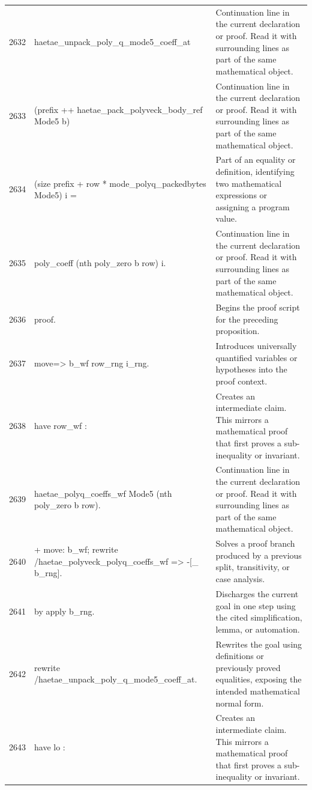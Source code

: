 \documentclass[10pt]{article}
\begin{document}
\begin{longtable}{r L{0.53\textwidth} L{0.37\textwidth}}
2632 & {\ttfamily\scriptsize   haetae\_unpack\_poly\_q\_mode5\_coeff\_at} & Continuation line in the current declaration or proof.  Read it with surrounding lines as part of the same mathematical object. \\
2633 & {\ttfamily\scriptsize     (prefix ++ haetae\_pack\_polyveck\_body\_ref Mode5 b)} & Continuation line in the current declaration or proof.  Read it with surrounding lines as part of the same mathematical object. \\
2634 & {\ttfamily\scriptsize     (size prefix + row * mode\_polyq\_packedbytes Mode5) i =} & Part of an equality or definition, identifying two mathematical expressions or assigning a program value. \\
2635 & {\ttfamily\scriptsize   poly\_coeff (nth poly\_zero b row) i.} & Continuation line in the current declaration or proof.  Read it with surrounding lines as part of the same mathematical object. \\
2636 & {\ttfamily\scriptsize proof.} & Begins the proof script for the preceding proposition. \\
2637 & {\ttfamily\scriptsize move=> b\_wf row\_rng i\_rng.} & Introduces universally quantified variables or hypotheses into the proof context. \\
2638 & {\ttfamily\scriptsize have row\_wf :} & Creates an intermediate claim.  This mirrors a mathematical proof that first proves a sub-inequality or invariant. \\
2639 & {\ttfamily\scriptsize   haetae\_polyq\_coeffs\_wf Mode5 (nth poly\_zero b row).} & Continuation line in the current declaration or proof.  Read it with surrounding lines as part of the same mathematical object. \\
2640 & {\ttfamily\scriptsize + move: b\_wf; rewrite /haetae\_polyveck\_polyq\_coeffs\_wf => -[\_ b\_rng].} & Solves a proof branch produced by a previous split, transitivity, or case analysis. \\
2641 & {\ttfamily\scriptsize   by apply b\_rng.} & Discharges the current goal in one step using the cited simplification, lemma, or automation. \\
2642 & {\ttfamily\scriptsize rewrite /haetae\_unpack\_poly\_q\_mode5\_coeff\_at.} & Rewrites the goal using definitions or previously proved equalities, exposing the intended mathematical normal form. \\
2643 & {\ttfamily\scriptsize have lo :} & Creates an intermediate claim.  This mirrors a mathematical proof that first proves a sub-inequality or invariant. \\

\end{longtable}
\end{document}
